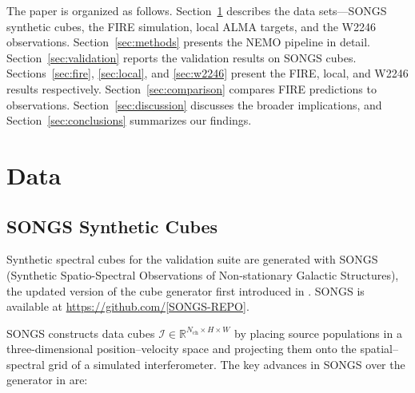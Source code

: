 \documentclass{aa}
\begin{document}
The paper is organized as follows. Section~\ref{sec:data} describes the data sets---SONGS synthetic cubes, the FIRE simulation, local ALMA targets, and the W2246 observations. Section~\ref{sec:methods} presents the NEMO pipeline in detail. Section~\ref{sec:validation} reports the validation results on SONGS cubes. Sections~\ref{sec:fire}, \ref{sec:local}, and \ref{sec:w2246} present the FIRE, local, and W2246 results respectively. Section~\ref{sec:comparison} compares FIRE predictions to observations. Section~\ref{sec:discussion} discusses the broader implications, and Section~\ref{sec:conclusions} summarizes our findings.

\section{Data}
\label{sec:data}

\subsection{SONGS Synthetic Cubes}
\label{sec:data_songs}

Synthetic spectral cubes for the validation suite are generated with SONGS (Synthetic Spatio-Spectral Observations of Non-stationary Galactic Structures), the updated version of the cube generator first introduced in . SONGS is available at \url{https://github.com/[SONGS-REPO]}.

SONGS constructs data cubes $\mathcal{I} \in \mathbb{R}^{N_\mathrm{ch} \times H \times W}$ by placing source populations in a three-dimensional position--velocity space and projecting them onto the spatial--spectral grid of a simulated interferometer. The key advances in SONGS over the generator in  are:
\end{document}
